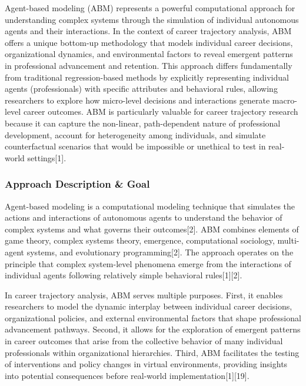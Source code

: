 \documentclass[main.tex]{subfiles}
\begin{document}
Agent-based modeling (ABM) represents a powerful computational approach for understanding complex systems through the simulation of individual autonomous agents and their interactions. In the context of career trajectory analysis, ABM offers a unique bottom-up methodology that models individual career decisions, organizational dynamics, and environmental factors to reveal emergent patterns in professional advancement and retention. This approach differs fundamentally from traditional regression-based methods by explicitly representing individual agents (professionals) with specific attributes and behavioral rules, allowing researchers to explore how micro-level decisions and interactions generate macro-level career outcomes. ABM is particularly valuable for career trajectory research because it can capture the non-linear, path-dependent nature of professional development, account for heterogeneity among individuals, and simulate counterfactual scenarios that would be impossible or unethical to test in real-world settings[1]\citep{chen2018agent}.

\subsubsection{Approach Description \& Goal}

Agent-based modeling is a computational modeling technique that simulates the actions and interactions of autonomous agents to understand the behavior of complex systems and what governs their outcomes[2]. ABM combines elements of game theory, complex systems theory, emergence, computational sociology, multi-agent systems, and evolutionary programming[2]. The approach operates on the principle that complex system-level phenomena emerge from the interactions of individual agents following relatively simple behavioral rules[1][2].

In career trajectory analysis, ABM serves multiple purposes. First, it enables researchers to model the dynamic interplay between individual career decisions, organizational policies, and external environmental factors that shape professional advancement pathways. Second, it allows for the exploration of emergent patterns in career outcomes that arise from the collective behavior of many individual professionals within organizational hierarchies. Third, ABM facilitates the testing of interventions and policy changes in virtual environments, providing insights into potential consequences before real-world implementation[1][19].
\end{document}
